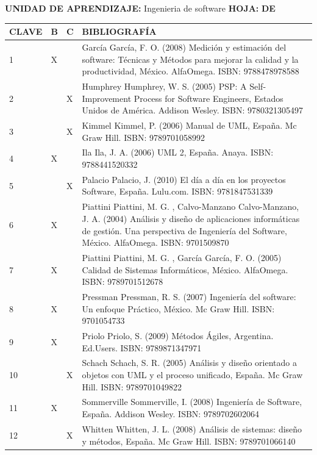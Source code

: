 \documentclass[10pt]{article}
\newcommand\tab[1][1cm]{\hspace*{#1}}
\begin{document}
\textbf{UNIDAD DE APRENDIZAJE:} Ingenieria de software
\tab[1cm]
\textbf{HOJA: } \thepage
\tab[0.25cm]
\textbf{DE } \pageref{LastPage}\\

\begin{table}[H]
  \begin{tabular}{|p{}|p{}|p{}|p{}|}
    \hline

    \textbf{CLAVE} & \textbf{B} & \textbf{C} & \textbf{BIBLIOGRAFÍA}\\\hline
    1&X &  &García García, F. O. (2008) Medición y estimación del software: Técnicas y Métodos para mejorar la calidad y la productividad, México. AlfaOmega. ISBN: 9788478978588\\ 2& & X &Humphrey Humphrey, W. S. (2005) PSP: A Self-Improvement Process for Software Engineers, Estados Unidos de América. Addison Wesley. ISBN: 9780321305497\\ 3& & X &Kimmel Kimmel, P. (2006) Manual de UML, España. Mc Graw Hill. ISBN: 9789701058992\\ 4&X &  &Ila Ila, J. A. (2006) UML 2, España. Anaya. ISBN: 9788441520332\\ 5& & X &Palacio Palacio, J. (2010) El día a día en los proyectos Software, España. Lulu.com. ISBN: 9781847531339\\ 6&X &  &Piattini Piattini, M. G. , Calvo-Manzano Calvo-Manzano, J. A. (2004) Análisis y diseño de aplicaciones informáticas de gestión. Una perspectiva de Ingeniería del Software, México. AlfaOmega. ISBN: 9701509870\\ 7&X &  &Piattini Piattini, M. G. , García García, F. O. (2005) Calidad de Sistemas Informáticos, México. AlfaOmega. ISBN: 9789701512678\\ 8&X &  &Pressman Pressman, R. S. (2007) Ingeniería del software: Un enfoque Práctico, México. Mc Graw Hill. ISBN: 9701054733\\ 9&X &  &Priolo Priolo, S. (2009) Métodos Ágiles, Argentina. Ed.Users. ISBN: 9789871347971\\ 10& & X &Schach Schach, S. R. (2005) Análisis y diseño orientado a objetos con UML y el proceso unificado, España. Mc Graw Hill. ISBN: 9789701049822\\ 11&X &  &Sommerville Sommerville, I. (2008) Ingeniería de Software, España. Addison Wesley. ISBN: 9789702602064\\ 12& & X &Whitten Whitten, J. L. (2008) Análisis de sistemas: diseño y métodos, España. Mc Graw Hill. ISBN: 9789701066140\\ 

    \hline
  \end{tabular}
\end{table}
\end{document}
